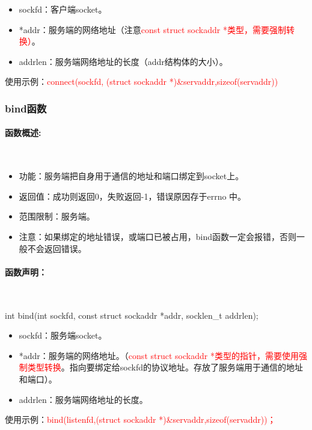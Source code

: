 \documentclass[UTF8]{article}%
\begin{document}
\begin{itemize}
    \item sockfd：客户端socket。
    \item *addr：服务端的网络地址（注意\textcolor{red}{const struct sockaddr *类型，需要强制转换）}。
    \item addrlen：服务端网络地址的长度（addr结构体的大小）。
\end{itemize}

使用示例：\textcolor{red}{connect(sockfd, (struct sockaddr *)\&servaddr,sizeof(servaddr))}

\subsubsection{bind函数}

\paragraph{函数概述:}~{}

\begin{itemize}
    \item 功能：服务端把自身用于通信的地址和端口绑定到socket上。
    \item 返回值：成功则返回0，失败返回-1，错误原因存于errno 中。
    \item 范围限制：服务端。
    \item 注意：如果绑定的地址错误，或端口已被占用，bind函数一定会报错，否则一般不会返回错误。
\end{itemize}

\paragraph{函数声明：}~{}

int bind(int sockfd, const struct sockaddr *addr, socklen\_t addrlen);

\begin{itemize}
    \item sockfd：服务端socket。
    \item *addr：服务端的网络地址。（\textcolor{red}{const struct sockaddr *类型的指针，需要使用强制类型转换}。指向要绑定给sockfd的协议地址。存放了服务端用于通信的地址和端口）。
    \item addrlen：服务端网络地址的长度。
\end{itemize}

使用示例：\textcolor{red}{bind(listenfd,(struct sockaddr *)\&servaddr,sizeof(servaddr))；}
\end{document}
